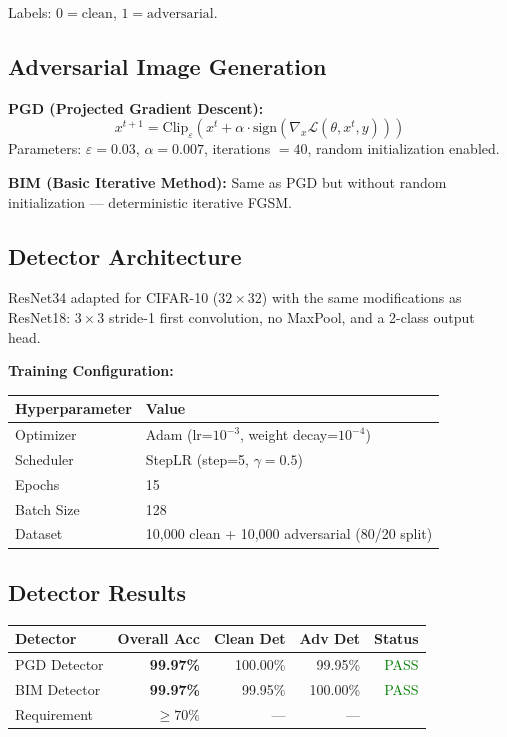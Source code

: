 \documentclass[12pt,a4paper]{article}
\begin{document}
Labels: $0 = \text{clean}$, $1 = \text{adversarial}$.

\subsection{Adversarial Image Generation}

\textbf{PGD (Projected Gradient Descent):}
\begin{equation}
    x^{t+1} = \text{Clip}_{\varepsilon}\left( x^t + \alpha \cdot
    \text{sign}\left(\nabla_x \mathcal{L}(\theta, x^t, y)\right) \right)
\end{equation}
Parameters: $\varepsilon = 0.03$, $\alpha = 0.007$, iterations $= 40$,
random initialization enabled.

\textbf{BIM (Basic Iterative Method):}
Same as PGD but without random initialization — deterministic iterative FGSM.

\subsection{Detector Architecture}

ResNet34 adapted for CIFAR-10 ($32 \times 32$) with the same modifications
as ResNet18: $3\times3$ stride-1 first convolution, no MaxPool, and a
2-class output head.

\textbf{Training Configuration:}
\begin{center}
\begin{tabular}{ll}
\toprule
\textbf{Hyperparameter} & \textbf{Value} \\
\midrule
Optimizer       & Adam (lr=$10^{-3}$, weight decay=$10^{-4}$) \\
Scheduler       & StepLR (step=5, $\gamma=0.5$) \\
Epochs          & 15 \\
Batch Size      & 128 \\
Dataset         & 10,000 clean + 10,000 adversarial (80/20 split) \\
\bottomrule
\end{tabular}
\end{center}

\subsection{Detector Results}

\begin{center}
\begin{tabular}{lrrrr}
\toprule
\textbf{Detector} & \textbf{Overall Acc} & \textbf{Clean Det} & \textbf{Adv Det} & \textbf{Status} \\
\midrule
PGD Detector & \textbf{99.97\%} & 100.00\% & 99.95\% & \textcolor{green}{PASS} \\
BIM Detector & \textbf{99.97\%} & 99.95\%  & 100.00\% & \textcolor{green}{PASS} \\
Requirement  & $\geq 70\%$      & —        & —        & \\
\bottomrule
\end{tabular}
\end{center}
\end{document}
